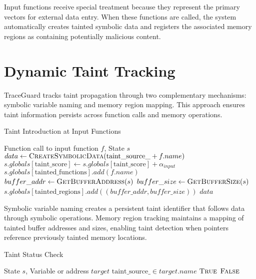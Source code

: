 Input functions receive special treatment because they represent the primary vectors for external data entry. When these functions are called, the system automatically creates tainted symbolic data and registers the associated memory regions as containing potentially malicious content.

\section{Dynamic Taint Tracking}

TraceGuard tracks taint propagation through two complementary mechanisms: symbolic variable naming and memory region mapping. This approach ensures taint information persists across function calls and memory operations.

\begin{algorithm}[H]
\caption{Taint Introduction at Input Functions}
\begin{algorithmic}[1]
\Require Function call to input function $f$, State $s$
\State $data \gets \textsc{CreateSymbolicData}(\text{taint\_source\_} + f.name)$
\State $s.globals[\text{taint\_score}] \gets s.globals[\text{taint\_score}] + \alpha_{input}$
\State $s.globals[\text{tainted\_functions}].add(f.name)$
    \State $buffer\_addr \gets \textsc{GetBufferAddress}(s)$
    \State $buffer\_size \gets \textsc{GetBufferSize}(s)$
    \State $s.globals[\text{tainted\_regions}].add((buffer\_addr, buffer\_size))$
\EndIf
\State \Return $data$
\end{algorithmic}
\end{algorithm}

Symbolic variable naming creates a persistent taint identifier that follows data through symbolic operations. Memory region tracking maintains a mapping of tainted buffer addresses and sizes, enabling taint detection when pointers reference previously tainted memory locations.

\begin{algorithm}[H]
\caption{Taint Status Check}
\begin{algorithmic}[1]
\Require State $s$, Variable or address $target$
    \State \Return $\text{taint\_source\_} \in target.name$
            \State \Return $\textsc{True}$
        \EndIf
    \EndFor
\EndIf
\State \Return $\textsc{False}$
\end{algorithmic}
\end{algorithm}

